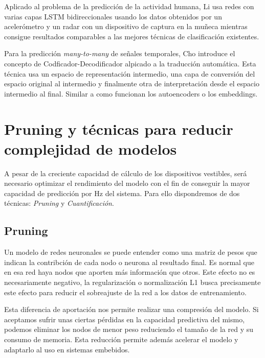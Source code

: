 \documentclass[../tfm.tex]{subfiles}
\begin{document}
Aplicado al problema de la predicción de la actividad humana, Li\cite{Li2019}  usa redes con varias capas LSTM bidireccionales usando los datos obtenidos por un acelerómetro y un radar con un dispositivo de captura en la muñeca mientras consigue resultados comparables a las mejores técnicas de clasificación existentes.

Para la predicción \textit{many-to-many} de señales temporales, Cho \cite{cho2014} introduce el concepto de Codficador-Decodificador alpicado a la traducción automática. Esta técnica usa un espacio de representación intermedio, una capa de conversión del espacio original al intermedio y finalmente otra de interpretación desde el espacio intermedio al final. Similar a como funcionan los autoencoders o los embeddings.

\section{Pruning y técnicas para reducir complejidad de modelos}\label{sa_optimizacion}

A pesar de la creciente capacidad de cálculo de los dispositivos vestibles, será necesario optimizar el rendimiento del modelo con el fin de conseguir la mayor capacidad de predicción por Hz del sistema. Para ello dispondremos de dos técnicas: \textit{Pruning} y \textit{Cuantificación}.

\subsection{Pruning}
Un modelo de redes neuronales se puede entender como una matriz de pesos que indican la contribción de cada nodo o neurona al resultado final. Es normal que en esa red haya nodos que aporten más información que otros. Este efecto no es necesariamente negativo, la regularización o normalización L1 busca precisamente este efecto para reducir el sobreajuste de la red a los datos de entrenamiento.

Esta diferencia de aportación nos permite realizar una compresión del modelo. Si aceptamos sufrir unas ciertas pérdidas en la capacidad predictiva del mismo, podemos eliminar los nodos de menor peso reduciendo el tamaño de la red y su consumo de memoria. Esta reducción permite además acelerar el modelo y adaptarlo al uso en sistemas embebidos.
\end{document}
